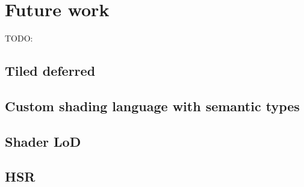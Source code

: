 
\chapter{ Future work }
\label{Chapter8}

TODO: 

\section{Tiled deferred}
\section{Custom shading language with semantic types}
\section{Shader LoD}
\section{HSR}

